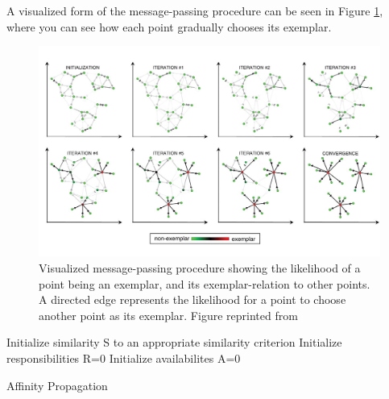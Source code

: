 \documentclass[11pt,a4paper]{article}
\begin{document}
A visualized form of the message-passing procedure can be seen in Figure \ref{fig:iterations}, where you can see how each point gradually chooses its exemplar.
\begin{figure}[h!]
	\centering
	\includegraphics[width=\textwidth]{../figures/frey-dueck-cluster.jpg}
	\caption{Visualized message-passing procedure \cite{frey2007clustering} showing the likelihood of a point being an exemplar, and its exemplar-relation to other points. A directed edge represents the likelihood for a point to choose another point as its exemplar. Figure reprinted from \cite[p.~973]{frey2007clustering}}
	\label{fig:iterations}
\end{figure}

\begin{algorithm}[h!]
	\label{lst:pseudoap}
	Initialize similarity S to an appropriate similarity criterion\;
	Initialize responsibilities R=0\;
	Initialize availabilites A=0\;
	\caption{Affinity Propagation}
\end{algorithm}
\end{document}
